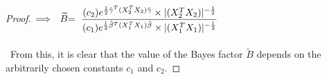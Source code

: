 \documentclass[10pt,a4paper]{article}
\begin{document}
\begin{proof}
$\Longrightarrow \ \ \widetilde{B} \mathlarger{ = \ \dfrac{(c_2) e^{\frac{1}{2}\hat{\gamma}^T(X_2^TX_2)\hat{\gamma}}\times|(X_2^TX_2)|^{-\frac{1}{2}}}{(c_1)  e^{\frac{1}{2}\hat{\beta}^T(X_1^TX_1)\hat{\beta}}\times|(X_1^TX_1)|^{-\frac{1}{2}}}}$\\
\\\
From this, it is clear that the value of the Bayes factor $\widetilde{B}$ depends on the arbitrarily chosen constants $c_1$ and $c_2$.
\end{proof}
\end{document}
